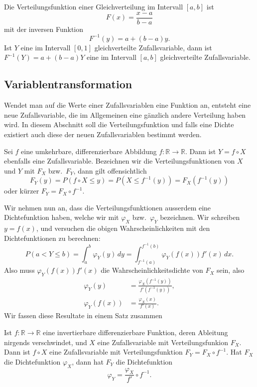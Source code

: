 \begin{beispiel}
Die Verteilungsfunktion einer Gleichverteilung im Intervall $[a,b]$ ist
\[
F(x)=\frac{x-a}{b-a}
\]
mit der inversen Funktion
\[
F^{-1}(y)=a+(b-a)y.
\]
Ist $Y$ eine im Intervall $[0,1]$ gleichverteilte Zufallsvariable, dann ist
$F^{-1}(Y)=a+(b-a)Y$ eine im Intervall $[a,b]$ gleichverteilte Zufallsvariable.
\end{beispiel}

\subsection{Variablentransformation}
Wendet man auf die Werte einer Zufallsvariablen eine Funktion an, entsteht
eine neue Zufallsvariable, die im Allgemeinen eine gänzlich andere Verteilung
haben wird.
In diesem Abschnitt soll die Verteilungsfunktion und falls
eine Dichte existiert auch diese der neuen Zufallsvariablen bestimmt werden.

Sei $f$ eine umkehrbare, differenzierbare Abbildung
$f\colon\mathbb{R}\to\mathbb{R}$.
Dann ist $Y=f\circ X$ ebenfalls eine
Zufallsvariable.
Bezeichnen wir die Verteilungsfunktionen von $X$ und $Y$
mit $F_X$ bzw.~$F_Y$, dann gilt offensichtlich
\[
F_Y(y)=P(f\circ X\le y)=P(X\le f^{-1}(y))=F_X(f^{-1}(y))
\]
oder kürzer $F_Y=F_X\circ f^{-1}$.

Wir nehmen nun an, dass die Verteilungsfunktionen ausserdem eine
Dichtefunktion haben, welche wir mit $\varphi_X$ bzw.~$\varphi_Y$
bezeichnen.
Wir schreiben $y=f(x)$, und versuchen die obigen
Wahrscheinlichkeiten mit den Dichtefunktionen zu berechnen:
\[
P(a<Y\le b)
=\int_a^b\varphi_Y(y)\,dy
=\int_{f^{-1}(a)}^{f^{-1}(b)}\varphi_Y(f(x)) f'(x)\,dx.
\]
Also muss $\varphi_Y(f(x))f'(x)$ die Wahrscheinlichkeitsdichte von
$F_X$ sein, also 
\begin{align*}
\varphi_Y(y)&=\frac{\varphi_X(f^{-1}(y))}{f'(f^{-1}(y))},\\
\varphi_Y(f(x))&=\frac{\varphi_X(x)}{f'(x)}.
\end{align*}
Wir fassen diese Resultate in einem Satz zusammen

\begin{satz}
\label{satz-variablentransformation}
Ist $f\colon\mathbb{R}\to\mathbb{R}$ eine invertierbare
differenzierbare Funktion, deren Ableitung nirgends verschwindet,
und $X$ eine Zufallsvariable mit Verteilungsfunkion $F_X$.
Dann ist
$f\circ X$ eine Zufallsvariable mit Verteilungsfunktion
$F_Y=F_X\circ f^{-1}$.
Hat $F_X$ die Dichtefunktion $\varphi_X$, dann
hat $F_Y$ die Dichtefunktion
\[
\varphi_Y=\frac{\varphi_X}{f'}\circ f^{-1}.
\]
\end{satz}

